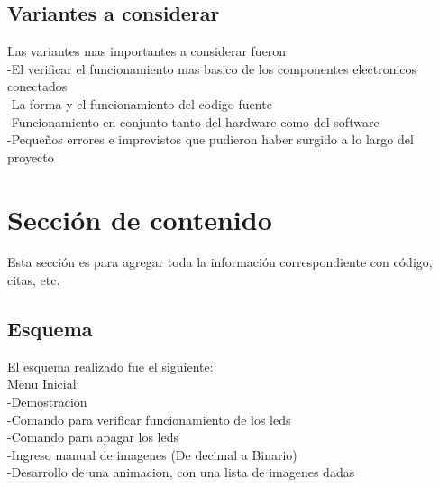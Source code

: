 \documentclass{article}
\begin{document}
\subsection{Variantes a considerar}\label{}
Las variantes mas importantes a considerar fueron\\
    -El verificar el funcionamiento mas basico de los componentes electronicos conectados\\
    -La forma y el funcionamiento del codigo fuente\\
    -Funcionamiento en conjunto tanto del hardware como del software\\
    -Pequeños errores e imprevistos que pudieron haber surgido a lo largo del proyecto
\newpage
\section{Sección de contenido} \label{contenido}
Esta sección es para agregar toda la información correspondiente con código, citas, etc.
\subsection{Esquema}
El esquema realizado fue el siguiente:\\
Menu Inicial:\\
    -Demostracion\\
    -Comando para verificar funcionamiento de los leds\\
    -Comando para apagar los leds\\
    -Ingreso manual de imagenes (De decimal a Binario)\\
    -Desarrollo de una animacion, con una lista de imagenes dadas
\end{document}
